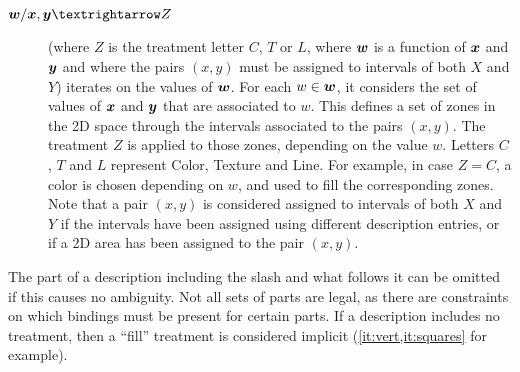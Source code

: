 \documentclass[version=last, pagesize, twoside=off, bibliography=totoc, DIV=calc, fontsize=12pt, a4paper, french, english]{scrartcl}
\begin{document}
\begin{description}
	\item[$\var{w}/\var{x}, \var{y}→Z$] (where $Z$ is the treatment letter $C$, $T$ or $L$, where ${\bm{w}}$ is a function of ${\bm{x}}$ and ${\bm{y}}$ and where the pairs $(x, y)$ must be assigned to intervals of both $X$ and $Y$) iterates on the values of ${\bm{w}}$. For each $w \in {\bm{w}}$, it considers the set of values of ${\bm{x}}$ and ${\bm{y}}$ that are associated to $w$. This defines a set of zones in the 2D space through the intervals associated to the pairs $(x, y)$. The treatment $Z$ is applied to those zones, depending on the value $w$. Letters $C$, $T$ and $L$ represent Color, Texture and Line. For example, in case $Z=C$, a color is chosen depending on $w$, and used to fill the corresponding zones. Note that a pair $(x, y)$ is considered assigned to intervals of both $X$ and $Y$ if the intervals have been assigned using different description entries, or if a 2D area has been assigned to the pair $(x, y)$. 
\end{description}
The part of a description including the slash and what follows it can be omitted if this causes no ambiguity. Not all sets of parts are legal, as there are constraints on which bindings must be present for certain parts. If a description includes no treatment, then a “fill” treatment is considered implicit (\cref{it:vert,it:squares} for example).
\end{document}
